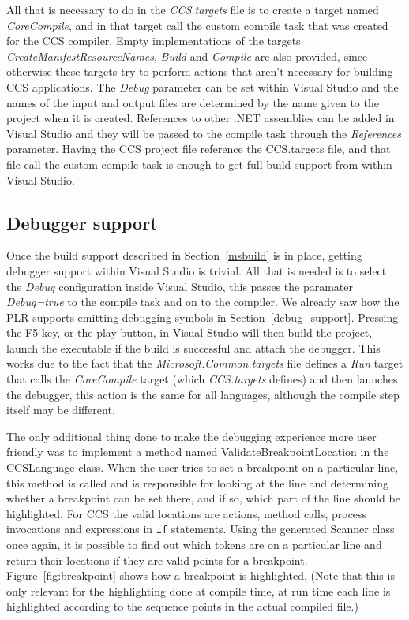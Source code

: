 	All that is necessary to do in the \textit{CCS.targets} file is to create a 
	target named \textit{CoreCompile}, and in that target call the custom 
	compile task that was created for the CCS compiler. Empty implementations of 
	the targets \textit{CreateManifestResourceNames}, \textit{Build} and 
	\textit{Compile} are also provided, since otherwise these targets try to 
	perform actions that aren't necessary for building CCS applications. The 
	\textit{Debug} parameter can be set within Visual Studio and the names of 
	the input and output files are determined by the name given to the project 
	when it is created. References to other .NET assemblies can be added in 
	Visual Studio and they will be passed to the compile task through the 
	\textit{References} parameter. Having the CCS project file reference the 
	CCS.targets file, and that file call the custom compile task is enough to 
	get full build support from within Visual Studio.
	
	\subsection{Debugger support}
	
	Once the build support described in Section~\ref{msbuild} is in place, 
	getting debugger support within Visual Studio is trivial. All that is needed 
	is to select the \textit{Debug} configuration inside Visual Studio, this 
	passes the paramater \textit{Debug=true} to the compile task and on to the 
	compiler. We already saw how the PLR supports emitting debugging symbols in 
	Section~\ref{debug_support}. Pressing the F5 key, or the play button, in 
	Visual Studio will then build the project, launch the executable if the 
	build is successful and attach the debugger. This works due to the fact that 
	the \textit{Microsoft.Common.targets} file defines a \textit{Run} target 
	that calls the \textit{CoreCompile} target (which \textit{CCS.targets} 
	defines) and then launches the debugger, this action is the same for all 
	languages, although the compile step itself may be different.
	
	The only additional thing done to make the debugging experience more user 
	friendly was to implement a method named \textsf{ValidateBreakpointLocation} 
	in the \textsf{CCSLanguage} class. When the user tries to set a breakpoint 
	on a particular line, this method is called and is responsible for looking 
	at the line and determining whether a breakpoint can be set there, and if 
	so, which part of the line should be highlighted. For CCS the valid 
	locations are actions, method calls, process invocations and expressions in 
	\texttt{if} statements. Using the generated \textsf{Scanner} class once 
	again, it is possible to find out which tokens are on a particular line and 
	return their locations if they are valid points for a breakpoint. 
	Figure~\ref{fig:breakpoint} shows how a breakpoint is highlighted. (Note 
	that this is only relevant for the highlighting done at compile time, at run 
	time each line is highlighted according to the sequence points in the actual 
	compiled file.)

